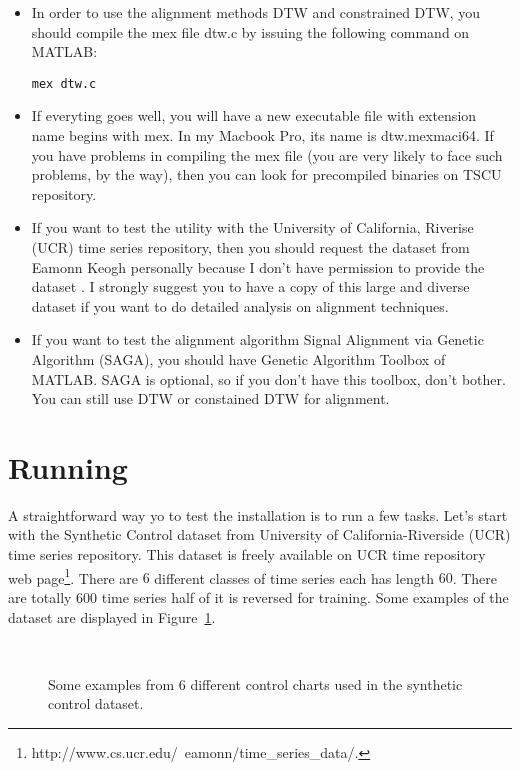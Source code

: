\documentclass{article}
\begin{document}
\begin{itemize}
\item In order to use the alignment methods DTW and constrained DTW, you should compile the mex file dtw.c by issuing the following command on MATLAB:
\begin{verbatim}
mex dtw.c
\end{verbatim}

\item If everyting goes well, you will have a new executable file with extension name begins with mex. In my Macbook Pro, its name is dtw.mexmaci64. If you have problems in compiling the mex file (you are very likely to face such problems, by the way), then you can look for precompiled binaries on TSCU repository.

\item If you want to test the utility with the University of California, Riverise (UCR) time series repository, then you should request the dataset from Eamonn Keogh personally because I don't have permission to provide the dataset \cite{UCRWeb}. I strongly suggest you to have a copy of this large and diverse dataset if you want to do detailed analysis on alignment techniques.

\item If you want to test the alignment algorithm Signal Alignment via Genetic Algorithm (SAGA), you should have Genetic Algorithm Toolbox of MATLAB. SAGA is optional, so if you don't have this toolbox, don't bother. You can still use DTW or constained DTW for alignment.
\end{itemize}
\section{Running}
A straightforward way yo to test the installation is to run a few tasks. Let's start with the Synthetic Control dataset from University of California-Riverside (UCR) time series repository. This dataset is freely available on UCR time repository web page\footnote{http://www.cs.ucr.edu/~eamonn/time\_series\_data/.}. There are $6$ different classes of time series each has length $60$. There are totally $600$ time series half of it is reversed for training. Some examples of the dataset are displayed in Figure~\ref{fig_synthetic}.

	\begin{figure}[!h]
	\centering
	\\%
	\caption{Some examples from 6 different control charts used in the synthetic control dataset.}
	\label{fig_synthetic}
	\end{figure}
\end{document}
